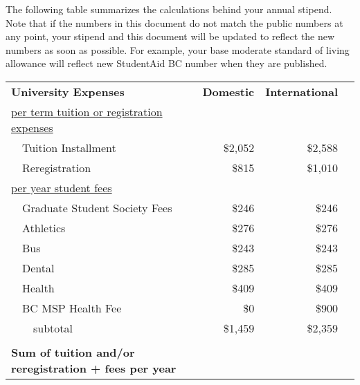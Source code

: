 \documentclass[11pt]{article}
\begin{document}
The following table summarizes the calculations behind your annual stipend.
Note that if the numbers in this document do not match the public numbers at any point, your stipend and this document will be updated to reflect the new numbers as soon as possible.
For example, your base moderate standard of living allowance will reflect new StudentAid BC number when they are published.
\begin{center}
	\begin{tabular}{lrrr}
		\textbf{University Expenses}                                    & \textbf{Domestic} & \textbf{International}   \\
		\underline{per term tuition or registration expenses}           &                   &                          \\
		~~Tuition Installment                                           & \$2,052           & \$2,588                  \\
		~~Reregistration                                                & \$815             & \$1,010                  \\
		\underline{per year student fees}                               &                   &                          \\
		~~Graduate Student Society Fees                                 & \$246             & \$246                    \\
		~~Athletics                                                     & \$276             & \$276                    \\
		~~Bus                                                           & \$243             & \$243                    \\
		~~Dental                                                        & \$285             & \$285                    \\
		~~Health                                                        & \$409             & \$409                    \\
		~~BC MSP Health Fee                                             & \$0               & \$900                    \\
		~~~~{subtotal}                                                  & \$1,459           & \$2,359                  \\
		                                                                &                   &                        & \\
		\textbf{Sum of tuition and/or reregistration + fees per year}   &                   &                          \\

\end{tabular}
\end{center}
\end{document}
